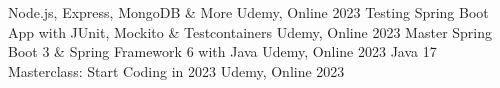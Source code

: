 \begin{cvhonors}
\cvhonor
    {Node.js, Express, MongoDB \& More} %
    {Udemy, Online } %
    {} %
    {2023} %
\cvhonor
    {Testing Spring Boot App with JUnit, Mockito \& Testcontainers} %
    {Udemy, Online } %
    {} %
    {2023} %
\cvhonor
    {Master Spring Boot 3 \& Spring Framework 6 with Java} %
    {Udemy, Online } %
    {} %
    {2023} %
\cvhonor
    {Java 17 Masterclass: Start Coding in 2023} %
    {Udemy, Online } %
    {} %
    {2023} %

    
\end{cvhonors}
